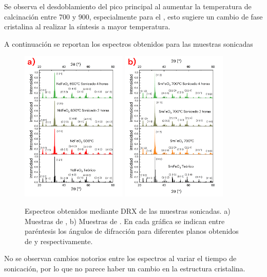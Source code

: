 \documentclass[../main.tex]{subfiles}
\begin{document}
Se observa el desdoblamiento del pico principal al aumentar la temperatura de calcinación entre 700 y 900\gradoC{}, especialmente para el \neod{}, esto sugiere un cambio de fase cristalina al realizar la síntesis a mayor temperatura.

A continuación se reportan los espectros obtenidos para las muestras sonicadas
\begin{figure}[H]
    \centering
    \includegraphics[width=0.45\textwidth]{fig/drxsonicndfeo3.png}
    \quad
    \includegraphics[width=0.45\textwidth]{fig/drxsonicsmfeo3.png}
    \caption{Espectros obtenidos mediante DRX de las muestras sonicadas. a) Muestras de \neod{}, b) Muestras de \sama{}. En cada gráfica se indican entre paréntesis los ángulos de difracción para diferentes planos obtenidos de \cite{ndfeo3} y \cite{smfeo3} respectivamente.}
    \label{fig:drxsoniccomp}
\end{figure}
No se observan cambios notorios entre los espectros al variar el tiempo de sonicación, por lo que no parece haber un cambio en la estructura cristalina.
\end{document}
